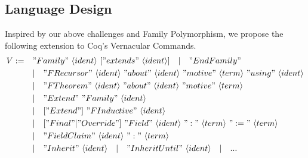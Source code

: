 
\subsection{Language Design}
Inspired by our above challenges and Family Polymorphism, we propose
the following extension to Coq's Vernacular Commands.
\begin{align*}
  V := \quad &"Family"~\langle ident\rangle~["extends"~\langle ident\rangle] 
  \quad |\quad "EndFamily" \\
  & |\quad "FRecursor"~\langle ident\rangle~"about"~\langle ident\rangle~"motive"~\langle term\rangle~"using"~\langle ident\rangle \\
  & | \quad "FTheorem"~\langle ident\rangle~"about"~\langle ident\rangle~"motive"~\langle term\rangle \\
  & |\quad "Extend"~"Family"~\langle ident\rangle \\ 
  & |\quad ["Extend"]~"FInductive"~\langle ident\rangle \\ 
  & |\quad ["Final" | "Override"]~"Field"~\langle ident\rangle~":"~\langle term \rangle~":="~\langle term \rangle \\
  & | \quad "FieldClaim"~\langle ident\rangle~":"~\langle term \rangle \\
  & | \quad "Inherit"~\langle ident\rangle \quad | \quad "Inherit Until"~\langle ident\rangle \quad | \quad ...
\end{align*}


